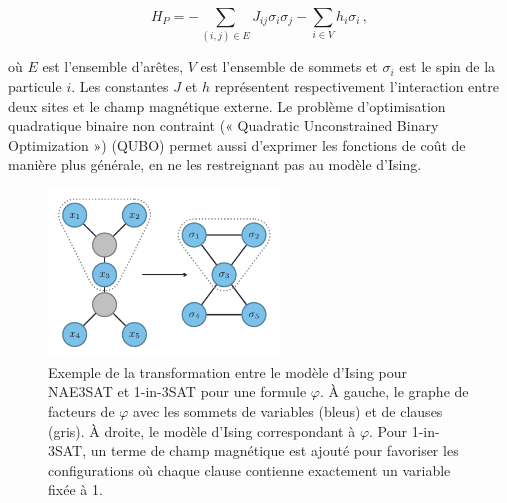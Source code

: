 \begin{equation}
    \label{eq:hamiltonien-ising}
    H_P = - \sum_{(i,j) \in E} J_{ij} \sigma_i \sigma_j - \sum_{i \in V} h_i \sigma_i \,,
\end{equation}

où $E$ est l'ensemble d'arêtes, $V$ est l'ensemble de sommets et $\sigma_{i}$ est le spin de la particule $i$. Les constantes $J$ et $h$ représentent respectivement l'interaction entre deux sites et le champ magnétique externe. Le problème d'optimisation quadratique binaire non contraint (« Quadratic Unconstrained Binary Optimization ») (QUBO) permet aussi d'exprimer les fonctions de coût de manière plus générale, en ne les restreignant pas au modèle d'Ising.

\begin{figure}[h]
    \centering
    \includegraphics[width=0.55\textwidth]{figures/ising-mapping}
    \caption[Transformation du problème \#NAE3SAT et \#1-in-3SAT au modèle d'Ising]{Exemple de la transformation entre le modèle d'Ising pour NAE3SAT et 1-in-3SAT pour une formule $\varphi$. À gauche, le graphe de facteurs de $\varphi$ avec les sommets de variables (bleus) et de clauses (gris). À droite, le modèle d'Ising correspondant à $\varphi$. Pour 1-in-3SAT, un terme de champ magnétique est ajouté pour favoriser les configurations où chaque clause contienne exactement un variable fixée à 1.}
    \label{fig:transformation-ising}
\end{figure}

